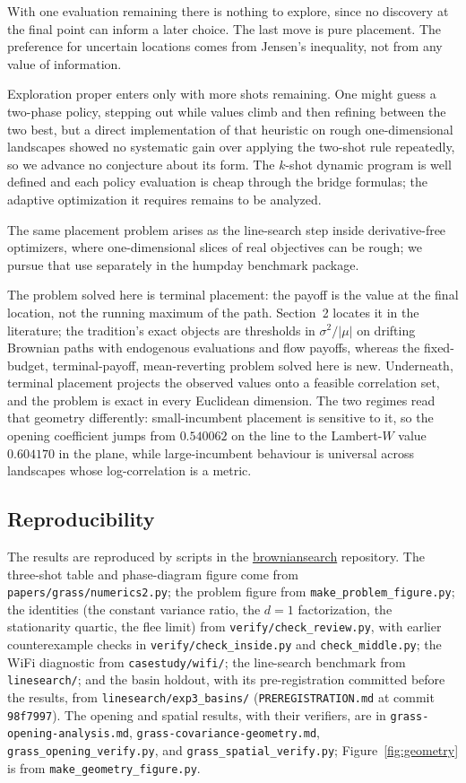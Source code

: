 \documentclass[11pt]{article}
\theoremstyle{itheads}
\begin{document}
With one evaluation remaining there is nothing to explore, since no
discovery at the final point can inform a later choice. The last move is pure placement. The preference for uncertain
locations comes from Jensen's inequality, not from any value of
information.

Exploration proper enters only with more shots remaining. One might
guess a two-phase policy, stepping out while values climb and then
refining between the two best, but a direct implementation of that
heuristic on rough one-dimensional landscapes showed no systematic
gain over applying the two-shot rule repeatedly, so we advance no
conjecture about its form. The $k$-shot dynamic program is
well defined and each policy evaluation is cheap through the bridge
formulas; the adaptive optimization it requires remains to be analyzed.

The same placement problem arises as the line-search step inside
derivative-free optimizers, where one-dimensional slices of real objectives can be rough; we pursue that
use separately in the humpday benchmark package.

The problem solved here is terminal placement: the payoff is the
value at the final location, not the running maximum of the path.
Section~2 locates it in the literature; the tradition's exact objects
are thresholds in $\sigma^{2}/|\mu|$ on drifting Brownian paths with
endogenous evaluations and flow payoffs, whereas the fixed-budget,
terminal-payoff, mean-reverting problem solved here is new. Underneath, terminal
placement projects the observed values onto a feasible correlation set,
and the problem is exact in every Euclidean dimension. The two regimes
read that geometry differently: small-incumbent placement is sensitive
to it, so the opening coefficient jumps from $0.540062$ on the line to
the Lambert-$W$ value $0.604170$ in the plane, while large-incumbent
behaviour is universal across landscapes whose log-correlation is a
metric.

\subsection*{Reproducibility}

The results are reproduced by scripts in the
\href{https://github.com/microprediction/browniansearch}{browniansearch}
repository. The three-shot table and phase-diagram figure come from
\texttt{papers/grass/numerics2.py}; the problem figure from
\texttt{make\_problem\_figure.py}; the identities (the constant
variance ratio, the $d=1$ factorization, the stationarity quartic,
the flee limit) from \texttt{verify/check\_review.py}, with earlier
counterexample checks in \texttt{verify/check\_inside.py} and
\texttt{check\_middle.py}; the WiFi diagnostic from
\texttt{casestudy/wifi/}; the line-search benchmark from
\texttt{linesearch/}; and the basin holdout, with its
pre-registration committed before the results, from
\texttt{linesearch/exp3\_basins/} (\texttt{PREREGISTRATION.md} at
commit \texttt{98f7997}). The opening and spatial results, with their
verifiers, are in \texttt{grass-opening-analysis.md},
\texttt{grass-covariance-geometry.md}, \texttt{grass\_opening\_verify.py},
and \texttt{grass\_spatial\_verify.py}; Figure~\ref{fig:geometry} is from
\texttt{make\_geometry\_figure.py}.
\end{document}

